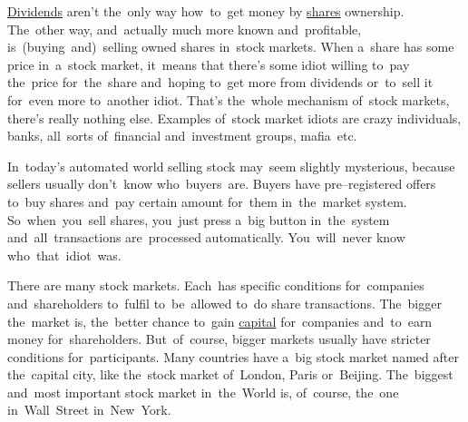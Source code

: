 \hyperref[shares]{Dividends} aren't the~only way how~to~get money by \hyperref[shares]{shares} ownership.
The~other way, and~actually much more known and~profitable, is~(buying~and)~selling owned shares in~stock markets.
When a~share has some price in~a~stock market, it~means that there's some idiot willing to~pay the~price for~the~share and~hoping to~get more from dividends or~to~sell it for~even more to~another idiot.
That's the~whole mechanism of~stock markets, there's really nothing else.
Examples of~stock market idiots are crazy individuals, banks, all~sorts of~financial and~investment groups, mafia~etc.

In~today's automated world selling stock may~seem slightly mysterious, because sellers usually don't~know who~buyers~are.
Buyers have pre--registered offers to~buy shares and~pay certain amount for~them in~the~market system.
So~when~you~sell shares, you~just press a~big  button in~the~system and~all~transactions are~processed automatically.
You~will~never know who~that~idiot~was.

There are many stock markets.
Each~has specific conditions for~companies and~shareholders to~fulfil to~be~allowed to~do share transactions.
The~bigger the~market is, the~better chance to~gain \hyperref[capital]{capital} for~companies and~to~earn money for~shareholders.
But~of~course, bigger markets usually have stricter conditions for~participants.
Many countries have a~big stock market named after the~capital city, like the~stock market of~London, Paris or~Beijing.
The~biggest and~most important stock market in~the~World is, of~course, the~one in~Wall~Street in~New~York.
\newpage
